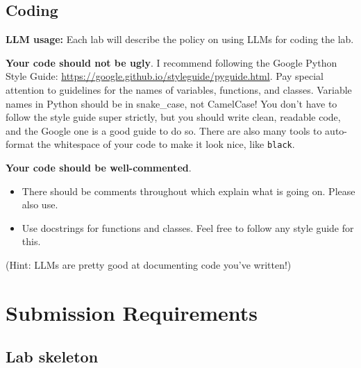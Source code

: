 \documentclass[letterpaper,12pt]{article}
\begin{document}
\subsection{Coding}

\textbf{LLM usage:} Each lab will describe the policy on using LLMs for coding the lab.

\textbf{Your code should not be ugly}. I recommend following the Google Python Style Guide: \url{https://google.github.io/styleguide/pyguide.html}. Pay special attention to guidelines for the names of variables, functions, and classes. Variable names in Python should be in snake\_case, not CamelCase! You don't have to follow the style guide super strictly, but you should write clean, readable code, and the Google one is a good guide to do so. There are also many tools to auto-format the whitespace of your code to make it look nice, like \texttt{black}.

\textbf{Your code should be well-commented}.
\begin{itemize}
  \item There should be comments throughout which explain what is going on. Please also use.
  \item Use docstrings for functions and classes. Feel free to follow any style guide for this.
\end{itemize}
(Hint: LLMs are pretty good at documenting code you've written!)


\section{Submission Requirements}

\subsection{Lab skeleton}
\end{document}
